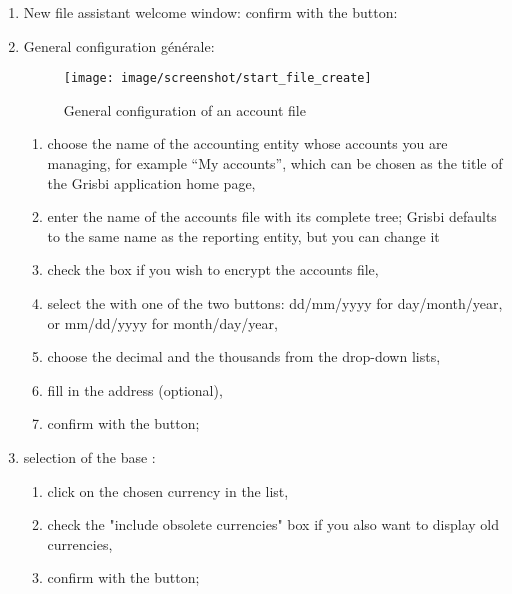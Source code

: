 \begin{enumerate}
\item New file assistant welcome window: confirm with the  button:
\item General configuration
générale:




\begin{figure}[htbp]
\begin{center}
\texttt{[image: image/screenshot/start\_file\_create]}
\end{center}
\caption{General configuration of an account file}
\label{start-file-create-img}
\end{figure}



\begin{enumerate} 
 \item choose the name of the accounting entity whose accounts you are managing, for example \enquote{My accounts}, which can be chosen as the title of the Grisbi application home page,
\item enter the name of the accounts file with its complete tree; Grisbi defaults to the same name as the reporting entity, but you can change it
\item check the   box if you wish \gls{to encrypt} the accounts file,
\item select the  with one of the two buttons: dd/mm/yyyy for day/month/year, or  mm/dd/yyyy for month/day/year,
\item choose the decimal  and the thousands from the drop-down lists,
 \item fill in the address (optional),
 \item  confirm with the   button;
\end{enumerate}

\item selection of the base :
\begin{enumerate} 
 \item click on the chosen currency in the list,
\item check the "include obsolete currencies" box if you also want to display old currencies,
\item confirm with the  button;
\end{enumerate}


\end{enumerate}
